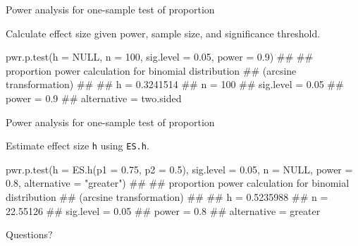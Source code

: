 \documentclass[12pt, t, xcolor=dvipsnames]{beamer}
\newcommand{\code}[1]{\colorbox{codegray}{\textcolor{black!95}{\texttt{#1}}}}
\begin{document}
\begin{frame}[fragile]{Power analysis for one-sample test of proportion}

Calculate effect size given power, sample size, and significance threshold.

\begin{Rcode}
pwr.p.test(h = NULL, n = 100, sig.level = 0.05, power = 0.9)
## 
##      proportion power calculation for binomial distribution 
##      (arcsine transformation) 
## 
##               h = 0.3241514
##               n = 100
##       sig.level = 0.05
##           power = 0.9
##     alternative = two.sided
\end{Rcode}

\end{frame}

\begin{frame}[fragile]{Power analysis for one-sample test of proportion}

Estimate effect size \code{h} using \code{ES.h}. 

\begin{Rcode}
pwr.p.test(h = ES.h(p1 = 0.75, p2 = 0.5), sig.level = 0.05, 
           n = NULL, power = 0.8, 
           alternative = "greater")
## 
##      proportion power calculation for binomial distribution 
##      (arcsine transformation) 
## 
##               h = 0.5235988
##               n = 22.55126
##       sig.level = 0.05
##           power = 0.8
##     alternative = greater
\end{Rcode}

\end{frame}

\begin{frame}[c]
  \large{Questions?}
\end{frame}


% 
% 
% 
% 
% 
% 
% 
\end{document}

